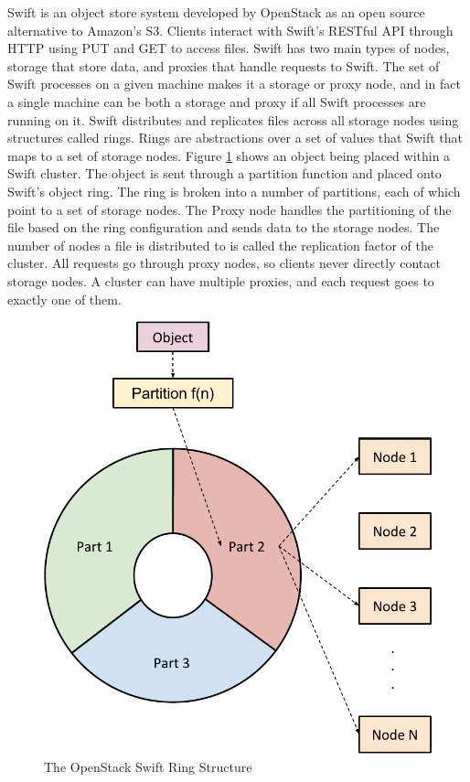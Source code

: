 Swift is an object store system developed by OpenStack as an open source alternative to Amazon's S3. Clients interact with Swift's RESTful API through HTTP using PUT and GET to access files. Swift has two main types of nodes, storage that store data, and proxies that handle requests to Swift. The set of Swift processes on a given machine makes it a storage or proxy node, and in fact a single machine can be both a storage and proxy if all Swift processes are running on it. Swift distributes and replicates files across all storage nodes using structures called rings. Rings are abstractions over a set of values that Swift that maps to a set of storage nodes. Figure \ref{fig:swift} shows an object being placed within a Swift cluster. The object is sent through a partition function and placed onto Swift's object ring. The ring is broken into a number of partitions, each of which point to a set of storage nodes. The Proxy node handles the partitioning of the file based on the ring configuration and sends data to the storage nodes. The number of nodes a file is distributed to is called the replication factor of the cluster. All requests go through proxy nodes, so clients never directly contact storage nodes. A cluster can have multiple proxies, and each request goes to exactly one of them.

\begin{figure}[h]
\centering
\includegraphics[scale=0.7]{figures/swiftrings}
\caption{The OpenStack Swift Ring Structure}
\label{fig:swift}
\end{figure}

